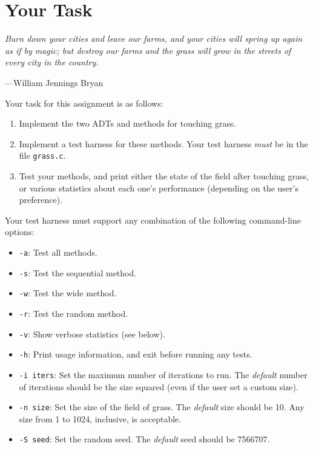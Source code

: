 \documentclass[11pt]{article}
\begin{document}
\section{Your Task}

\setlength{\epigraphwidth}{0.53\textwidth}
\epigraph{\emph{Burn down your cities and leave our farms, and your cities will spring up again as if by magic; but destroy our farms and the grass will grow in the streets of every city in the country.}}{---William Jennings Bryan}
\setlength{\epigraphwidth}{0.76\textwidth}

\noindent
Your task for this assignment is as follows:

\begin{enumerate}
    \item Implement the two ADTs and methods for touching grass.
    \item Implement a test harness for these methods. Your test harness \emph{must} be in the file \texttt{grass.c}.
    \item Test your methods, and print either the state of the field after touching grass, or various statistics about each one's performance (depending on the user's preference).
\end{enumerate}

Your test harness must support any combination of the following command-line options:

\begin{itemize}
    \item \texttt{-a}: Test all methods.
    \item \texttt{-s}: Test the sequential method.
    \item \texttt{-w}: Test the wide method.
    \item \texttt{-r}: Test the random method.
    \item \texttt{-v}: Show verbose statistics (see below).
    \item \texttt{-h}: Print usage information, and exit before running any tests.
    \item \texttt{-i iters}: Set the maximum number of iterations to run. The \emph{default} number of iterations should be the size squared (even if the user set a custom size).
    \item \texttt{-n size}: Set the size of the field of grass. The \emph{default} size should be 10. Any size from 1 to 1024, inclusive, is acceptable.
    \item \texttt{-S seed}: Set the random seed. The \emph{default} seed should be 7566707.
\end{itemize}
\end{document}
